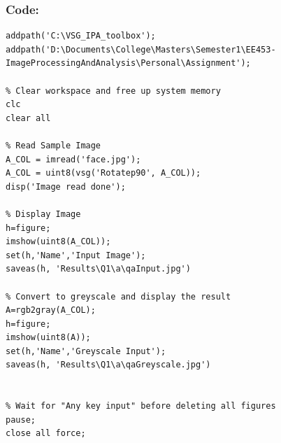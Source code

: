\documentclass[a4paper]{article}
\begin{document}
	\subsubsection{Code:}
	\begin{lstlisting}[caption={Part 1 a}]
	% Setup Paths to VSG Toolbox and Local Data
addpath('C:\VSG_IPA_toolbox');
addpath('D:\Documents\College\Masters\Semester1\EE453-ImageProcessingAndAnalysis\Personal\Assignment');

% Clear workspace and free up system memory
clc
clear all

% Read Sample Image
A_COL = imread('face.jpg');
A_COL = uint8(vsg('Rotatep90', A_COL));
disp('Image read done');

% Display Image
h=figure;
imshow(uint8(A_COL));
set(h,'Name','Input Image');
saveas(h, 'Results\Q1\a\qaInput.jpg')

% Convert to greyscale and display the result
A=rgb2gray(A_COL);
h=figure;
imshow(uint8(A));
set(h,'Name','Greyscale Input');
saveas(h, 'Results\Q1\a\qaGreyscale.jpg')


% Wait for "Any key input" before deleting all figures
pause;
close all force;
\end{lstlisting}
\end{document}
